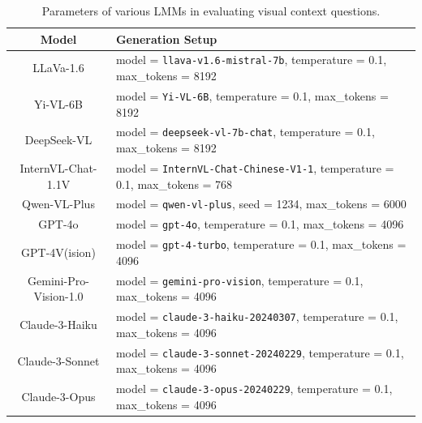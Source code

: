 \begin{table}[!t]
\centering
\small
\begin{tabular}{cl}
    \toprule
    \textbf{Model} & \textbf{Generation Setup} \\
    \midrule
    LLaVa-1.6 & model = \texttt{llava-v1.6-mistral-7b}, temperature = 0.1, max\_tokens = 8192\\
    \midrule
    Yi-VL-6B & model = \texttt{Yi-VL-6B}, temperature = 0.1, max\_tokens = 8192\\
    \midrule
    DeepSeek-VL & model = \texttt{deepseek-vl-7b-chat}, temperature = 0.1, max\_tokens = 8192\\
    \midrule
    InternVL-Chat-1.1V & model = \texttt{InternVL-Chat-Chinese-V1-1}, temperature = 0.1, max\_tokens = 768 \\
    \midrule
    Qwen-VL-Plus & model = \texttt{qwen-vl-plus}, seed = 1234, max\_tokens = 6000\\
    \midrule
    GPT-4o 
    & model = \texttt{gpt-4o}, temperature = 0.1, max\_tokens = 4096\\
    \midrule
    GPT-4V(ision) 
    & model = \texttt{gpt-4-turbo}, temperature = 0.1, max\_tokens = 4096\\
    \midrule
    Gemini-Pro-Vision-1.0 
    & model = \texttt{gemini-pro-vision}, temperature = 0.1, max\_tokens = 4096\\
    \midrule
    Claude-3-Haiku 
    & model = \texttt{claude-3-haiku-20240307}, temperature = 0.1, max\_tokens = 4096\\
    \midrule
    Claude-3-Sonnet 
    & model = \texttt{claude-3-sonnet-20240229}, temperature = 0.1, max\_tokens = 4096\\
    \midrule
    Claude-3-Opus 
    & model = \texttt{claude-3-opus-20240229}, temperature = 0.1, max\_tokens = 4096\\
    \bottomrule
\end{tabular}
\caption{Parameters of various LMMs in evaluating visual context questions.}
\label{tab:model_param_locality}
\end{table}




